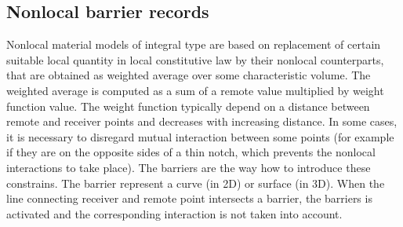 \documentclass[a4paper]{article}
\begin{document}
\subsection{Nonlocal barrier records}
\label{_NonlocalBarrierRecords}
Nonlocal material models of integral type are based on replacement of
certain suitable local quantity in local constitutive law by their
nonlocal counterparts, that are obtained as weighted average over
some characteristic volume. The weighted average is computed as a sum
of a remote value multiplied by weight function value. The weight
function typically depend on a distance between remote and receiver
points and decreases with increasing distance. In some cases, it is
necessary to disregard mutual interaction between some points (for
example if they are on the opposite sides of a thin notch, which
prevents the nonlocal interactions to take place). The barriers are
the way how to introduce these constrains. The barrier represent a
curve (in 2D) or surface (in 3D). When the line connecting receiver and
remote point intersects a barrier, the barriers is activated and the
corresponding interaction is not taken into account.
\end{document}
